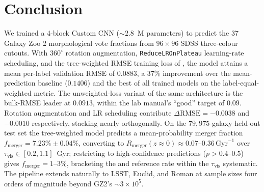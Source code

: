 \documentclass[10pt,preprint2]{aastex}
\begin{document}
\section{Conclusion}
\label{sec:conclusion}

We trained a 4-block Custom CNN ($\sim 2.8$~M parameters) to predict the 37 Galaxy Zoo 2 morphological vote fractions from $96 \times 96$ SDSS three-colour cutouts. With $360^\circ$ rotation augmentation, \texttt{ReduceLROnPlateau} learning-rate scheduling, and the tree-weighted RMSE training loss of \citet{Dieleman2015}, the model attains a mean per-label validation RMSE of $\mathbf{0.0883}$, a $37\%$ improvement over the mean-prediction baseline ($0.1406$) and the best of all trained models on the label-equal-weighted metric. The unweighted-loss variant of the same architecture is the bulk-RMSE leader at $0.0913$, within the lab manual's ``good'' target of $0.09$. Rotation augmentation and LR scheduling contribute $\Delta \mathrm{RMSE} = -0.0038$ and $-0.0010$ respectively, stacking nearly orthogonally. On the $79{,}975$-galaxy held-out test set the tree-weighted model predicts a mean-probability merger fraction $f_{\mathrm{merger}} = 7.23\% \pm 0.04\%$, converting to $R_{\mathrm{merger}}(z \approx 0) \approx 0.07$--$0.36\,\mathrm{Gyr}^{-1}$ over $\tau_{\mathrm{vis}} \in [0.2, 1.1]$~Gyr; restricting to high-confidence predictions ($p > 0.4$--$0.5$) gives $f_{\mathrm{merger}} = 1$--$3\%$, bracketing the \citet{Lotz2011} and \citet{RodriguezGomez2015} reference rate within the $\tau_{\mathrm{vis}}$ systematic. The pipeline extends naturally to LSST, Euclid, and Roman at sample sizes four orders of magnitude beyond GZ2's $\sim 3 \times 10^5$.



\end{document}
